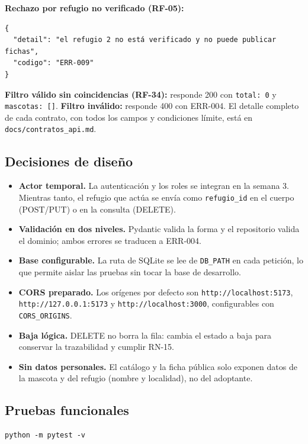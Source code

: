 \documentclass[11pt,a4paper]{article}
\newcommand{\code}[1]{\texttt{#1}}
\begin{document}
\textbf{Rechazo por refugio no verificado (RF-05):}

\begin{lstlisting}
{
  "detail": "el refugio 2 no está verificado y no puede publicar fichas",
  "codigo": "ERR-009"
}
\end{lstlisting}

\textbf{Filtro válido sin coincidencias (RF-34):} responde 200 con
\code{total: 0} y \code{mascotas: []}. \textbf{Filtro inválido:} responde 400
con ERR-004. El detalle completo de cada contrato, con todos los campos y
condiciones límite, está en \code{docs/contratos\_api.md}.

\subsection{Decisiones de diseño}

\begin{itemize}
\item \textbf{Actor temporal.} La autenticación y los roles se integran en la
  semana 3. Mientras tanto, el refugio que actúa se envía como
  \code{refugio\_id} en el cuerpo (POST/PUT) o en la consulta (DELETE).
\item \textbf{Validación en dos niveles.} Pydantic valida la forma y el
  repositorio valida el dominio; ambos errores se traducen a ERR-004.
\item \textbf{Base configurable.} La ruta de SQLite se lee de \code{DB\_PATH} en
  cada petición, lo que permite aislar las pruebas sin tocar la base de
  desarrollo.
\item \textbf{CORS preparado.} Los orígenes por defecto son
  \code{http://localhost:5173}, \code{http://127.0.0.1:5173} y
  \code{http://localhost:3000}, configurables con \code{CORS\_ORIGINS}.
\item \textbf{Baja lógica.} DELETE no borra la fila: cambia el estado a baja
  para conservar la trazabilidad y cumplir RN-15.
\item \textbf{Sin datos personales.} El catálogo y la ficha pública solo
  exponen datos de la mascota y del refugio (nombre y localidad), no del
  adoptante.
\end{itemize}

\subsection{Pruebas funcionales}

\begin{lstlisting}
python -m pytest -v
\end{lstlisting}
\end{document}
